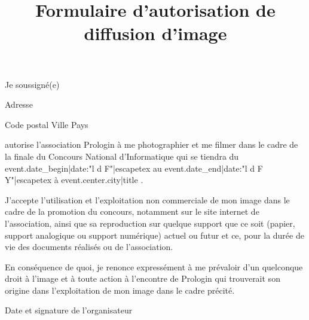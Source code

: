 \documentclass[a4paper,11pt]{prologin}
\title{Formulaire d'autorisation de diffusion d'image}
\begin{document}
Je soussigné(e) \hrulefill

Adresse \hrulefill

Code postal \hrulefill{} Ville \hrulefill\hrulefill\hrulefill{} Pays \hrulefill

autorise l'association Prologin à me photographier et me filmer dans
le cadre de la finale du Concours National d'Informatique qui se tiendra du
{{ event.date_begin|date:"l d F"|escapetex }} au
{{ event.date_end|date:"l d F Y"|escapetex }} à {{ event.center.city|title }}.

J'accepte l'utilisation et l'exploitation non commerciale de mon
image dans le cadre de la promotion du concours, notamment sur le site internet
de l'association, ainsi que sa reproduction sur quelque support que ce soit
(papier, support analogique ou support numérique) actuel ou futur et ce, pour la
durée de vie des documents réalisés ou de l'association.

En conséquence de quoi, je renonce expressément à me prévaloir d'un
quelconque droit à l'image et à toute action à l'encontre de Prologin qui
trouverait son origine dans l'exploitation de mon image dans le cadre précité.

\begin{signatureframe}{Date et signature de l'organisateur}\end{signatureframe}
\end{document}
